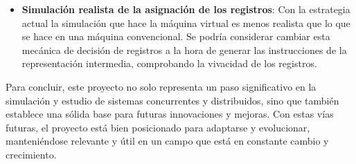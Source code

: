 \begin{itemize}
    \item \textbf{Simulación realista de la asignación de los registros}: Con la estrategia actual la simulación que hace la máquina virtual es menos realista que lo que se hace en una máquina convencional. Se podría considerar cambiar esta mecánica de decisión de registros a la hora de generar las instrucciones de la representación intermedia, comprobando la vivacidad de los registros.
\end{itemize}

Para concluir, este proyecto no solo representa un paso significativo en la simulación y estudio de sistemas concurrentes y distribuidos, sino que también establece una sólida base para futuras innovaciones y mejoras. Con estas vías futuras, el proyecto está bien posicionado para adaptarse y evolucionar, manteniéndose relevante y útil en un campo que está en constante cambio y crecimiento.